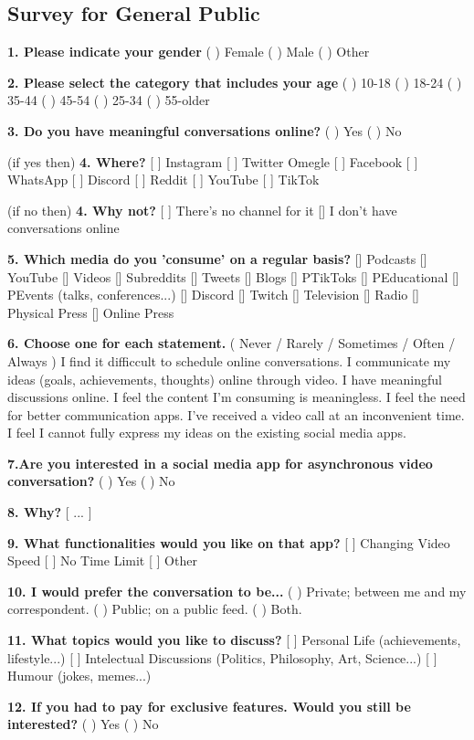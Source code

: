 \documentclass[12pt]{article}
\begin{document}
\subsection{Survey for General Public}\label{qgp}
\textbf{1. Please indicate your gender}
( ) Female ( ) Male ( ) Other

\textbf{2. Please select the category that includes your age}
( ) 10-18   ( ) 18-24   ( ) 35-44    ( ) 45-54 ( ) 25-34   ( )  55-older

\textbf{3. Do you have meaningful conversations online?}
( ) Yes   ( ) No

(if yes then) \textbf{4. Where?}
[ ] Instagram [ ]  Twitter Omegle  [ ]  Facebook [ ]  WhatsApp  [ ]  Discord  [ ] Reddit  [ ]  YouTube  [ ]  TikTok

(if no then) \textbf{4. Why not?}
[ ] There's no channel for it  [] I don't have conversations online 

\textbf{5. Which media do you 'consume' on a regular basis?}
[] Podcasts []  YouTube [] Videos [] Subreddits  []  Tweets
[] Blogs [] PTikToks [] PEducational [] PEvents (talks, conferences...) [] Discord
[]  Twitch [] Television []  Radio [] Physical Press [] Online Press

\textbf{6. Choose one for each statement. }( Never / Rarely / Sometimes / Often / Always )
I find it difficcult to schedule online conversations. 
I communicate my ideas (goals, achievements, thoughts) online through video.
I have meaningful discussions online.
I feel the content I'm consuming is meaningless.
I feel the need for better communication apps.
I've received a video call at an inconvenient time.
I feel I cannot fully express my ideas on the existing social media apps.

\textbf{7.Are you interested in a social media app for asynchronous video conversation?}
( ) Yes ( ) No

\textbf{8. Why?} [        ...        ]

\textbf{9. What functionalities would you like on that app?}
[ ] Changing Video Speed [ ] No Time Limit  [ ] Other

\textbf{10. I would prefer the conversation to be...}
( ) Private; between me and my correspondent.  ( ) Public; on a public feed. ( ) Both.

\textbf{11. What topics would you like to discuss?}
[ ] Personal Life (achievements, lifestyle...)   
[ ] Intelectual Discussions (Politics, Philosophy, Art, Science...)     [ ] Humour (jokes, memes...)

\textbf{12. If you had to pay for exclusive features. Would you still be interested?}
( ) Yes    ( ) No
\end{document}

